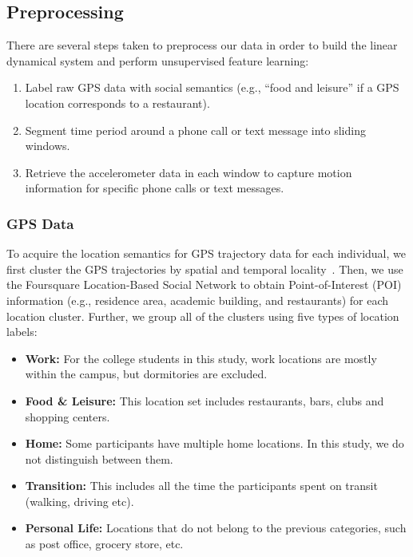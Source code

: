 
\subsection{Preprocessing}
There are several steps taken to preprocess our data in order to build the linear dynamical system and perform unsupervised feature learning: 

\begin{enumerate}
\item Label raw GPS data with social semantics (e.g., ``food and leisure'' if a GPS location corresponds to a restaurant). 
\item Segment time period around a phone call or text message into sliding windows.
\item Retrieve the accelerometer data in each window to capture motion information for specific phone calls or text messages. 
\end{enumerate}

\subsubsection{GPS Data}
To acquire the location semantics for GPS trajectory data for each individual, we first cluster the GPS trajectories by spatial and temporal locality~\citep{kang2004extracting,huang2016assessing}. Then, we use the Foursquare Location-Based Social Network to obtain Point-of-Interest (POI) information (e.g., residence area, academic building, and restaurants) for each location cluster. Further, we group all of the clusters using five types of location labels:

\begin{itemize}
\item \textbf{Work:} For the college students in this study, work locations are mostly within the campus, but dormitories are excluded.
\item \textbf{Food \& Leisure:} This location set includes restaurants, bars, clubs and shopping centers. 
\item \textbf{Home:} Some participants have multiple home locations. In this study, we do not distinguish between them.
\item \textbf{Transition:}  This includes all the time the participants spent on transit (walking, driving etc).
\item \textbf{Personal Life:}  Locations that do not belong to the previous categories, such as post office, grocery store, etc.
\end{itemize}

